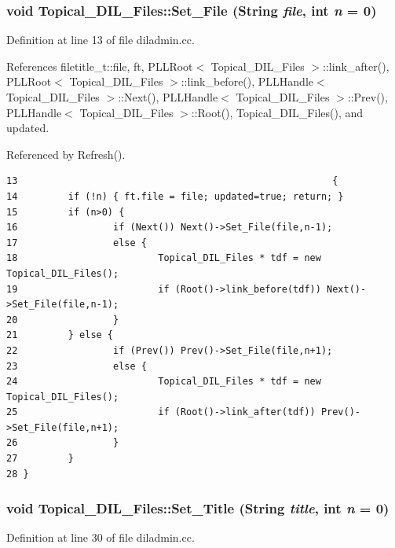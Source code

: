 \subsubsection{\setlength{\rightskip}{0pt plus 5cm}void Topical\_\-DIL\_\-Files::Set\_\-File ({\bf String} {\em file}, int {\em n} = 0)\hspace{0.3cm}{\tt  [protected]}}\label{classTopical__DIL__Files_b0}




Definition at line 13 of file diladmin.cc.

References filetitle\_\-t::file, ft, PLLRoot$<$ Topical\_\-DIL\_\-Files $>$::link\_\-after(), PLLRoot$<$ Topical\_\-DIL\_\-Files $>$::link\_\-before(), PLLHandle$<$ Topical\_\-DIL\_\-Files $>$::Next(), PLLHandle$<$ Topical\_\-DIL\_\-Files $>$::Prev(), PLLHandle$<$ Topical\_\-DIL\_\-Files $>$::Root(), Topical\_\-DIL\_\-Files(), and updated.

Referenced by Refresh().



\footnotesize\begin{verbatim}13                                                        {
14         if (!n) { ft.file = file; updated=true; return; }
15         if (n>0) {
16                 if (Next()) Next()->Set_File(file,n-1);
17                 else {
18                         Topical_DIL_Files * tdf = new Topical_DIL_Files();
19                         if (Root()->link_before(tdf)) Next()->Set_File(file,n-1);
20                 }
21         } else {
22                 if (Prev()) Prev()->Set_File(file,n+1);
23                 else {
24                         Topical_DIL_Files * tdf = new Topical_DIL_Files();
25                         if (Root()->link_after(tdf)) Prev()->Set_File(file,n+1);
26                 }
27         }
28 }
\end{verbatim}\normalsize 
{}
\subsubsection{\setlength{\rightskip}{0pt plus 5cm}void Topical\_\-DIL\_\-Files::Set\_\-Title ({\bf String} {\em title}, int {\em n} = 0)\hspace{0.3cm}{\tt  [protected]}}\label{classTopical__DIL__Files_b1}




Definition at line 30 of file diladmin.cc.

